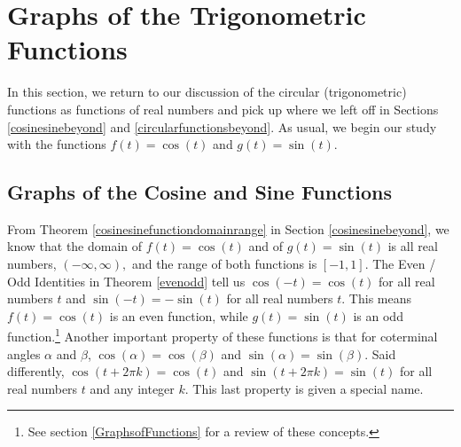 \section{Graphs of the Trigonometric Functions}

\label{TrigGraphs}

In this section, we return to our discussion of the circular (trigonometric) functions as functions of real numbers and pick up where we left off in Sections \ref{cosinesinebeyond} and \ref{circularfunctionsbeyond}.  As usual, we begin our study with the functions $f(t) = \cos(t)$ and $g(t) = \sin(t)$.  

\subsection{Graphs of the Cosine and Sine Functions}

From Theorem \ref{cosinesinefunctiondomainrange} in Section \ref{cosinesinebeyond}, we know that the domain of $f(t) = \cos(t)$ and of $g(t) = \sin(t)$ is all real numbers, $(-\infty, \infty),$ and the range of both functions is $[-1,1]$.  The Even / Odd Identities in Theorem \ref{evenodd} tell us $\cos(-t) = \cos(t)$ for all real numbers $t$ and $\sin(-t) = -\sin(t)$ for all real numbers $t$.  This means $f(t) = \cos(t)$ is an even function, while $g(t) = \sin(t)$ is an odd function.\footnote{See section \ref{GraphsofFunctions} for a review of these concepts.}  Another important property of these  functions is that for coterminal angles $\alpha$ and $\beta$, $\cos(\alpha) = \cos(\beta)$ and $\sin(\alpha) = \sin(\beta)$.  Said differently,  $\cos(t + 2\pi k) = \cos(t)$ and $\sin(t + 2\pi k) = \sin(t)$ for all real numbers $t$ and any integer $k$.  This last property is given a special name.

\smallskip


\medskip


